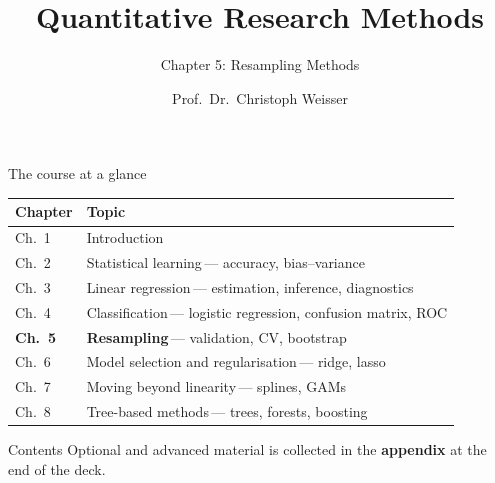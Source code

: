 \documentclass[aspectratio=169,11pt]{beamer}
\title{Quantitative Research Methods}
\subtitle{Chapter 5: Resampling Methods}
\author{Prof.\ Dr.\ Christoph Weisser}
\date{}\graphicspath{{images/}}
\begin{document}
\begin{frame}[plain]\titlepage\end{frame}

\begin{frame}{The course at a glance}
  \vspace{-1.5mm}
  \begin{center}
  \scriptsize
  \setlength{\tabcolsep}{5pt}
  \renewcommand{\arraystretch}{1.30}
  \begin{tabular}{@{\hspace{2pt}}l >{\raggedright\arraybackslash}p{}@{\hspace{2pt}}}
    \toprule
    \textbf{Chapter} & \textbf{Topic} \\
    \midrule
     {\color{accent}Ch.\ 1} & Introduction \\
    \rowcolor{black!3} {\color{accent}Ch.\ 2} & Statistical learning\,{\color{black!45}--- accuracy, bias--variance} \\
     {\color{accent}Ch.\ 3} & Linear regression\,{\color{black!45}--- estimation, inference, diagnostics} \\
    \rowcolor{black!3} {\color{accent}Ch.\ 4} & Classification\,{\color{black!45}--- logistic regression, confusion matrix, ROC} \\
    \rowcolor{accent!18} \textbf{Ch.\ 5} & \textbf{Resampling}\,{\color{accent!75!black}--- validation, CV, bootstrap} \\
    \rowcolor{black!3} {\color{accent}Ch.\ 6} & Model selection and regularisation\,{\color{black!45}--- ridge, lasso} \\
     {\color{accent}Ch.\ 7} & Moving beyond linearity\,{\color{black!45}--- splines, GAMs} \\
    \rowcolor{black!3} {\color{accent}Ch.\ 8} & Tree-based methods\,{\color{black!45}--- trees, forests, boosting} \\
    \bottomrule
  \end{tabular}
  \end{center}
\end{frame}


\begin{frame}{Contents}\small
  \tableofcontents[hideallsubsections]
  \vfill
  {\tiny Optional and advanced material is collected in the \textbf{appendix} at the end of the deck.}
\end{frame}
\end{document}
